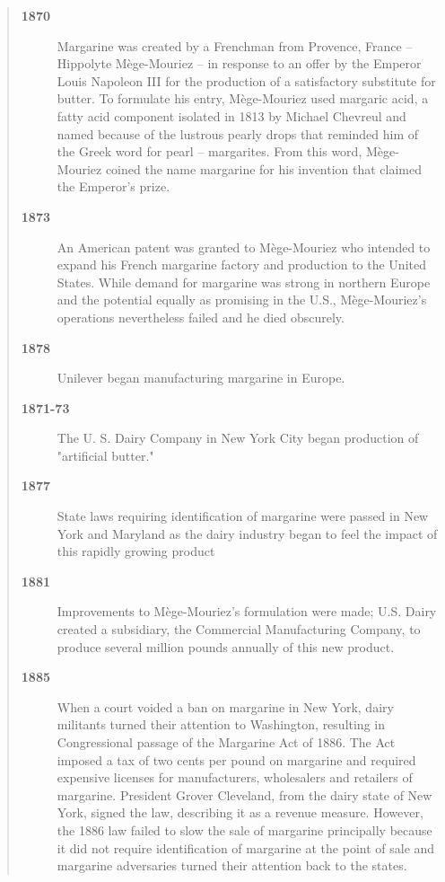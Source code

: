 \documentclass[mnsc,blindrev]{informs3} %
\begin{document}
\begin{quotation}

\begin{description}

\item[\bf 1870] Margarine was created by a Frenchman from Provence,
France -- Hippolyte M\`ege-Mouriez -- in response to an offer by
the Emperor Louis Napoleon III for the production of a satisfactory
substitute for butter. To formulate his entry, M\`ege-Mouriez used
margaric acid, a fatty acid component isolated in 1813 by Michael
Chevreul and named because of the lustrous pearly drops that reminded
him of the Greek word for pearl -- margarites. From this word,
M\`ege-Mouriez coined the name margarine for his invention that
claimed the Emperor's prize.

\item[\bf 1873] An American patent was granted to M\`ege-Mouriez who
intended to expand his French margarine factory and production to
the United States. While demand for margarine was strong in northern
Europe and the potential equally as promising in the U.S.,
M\`ege-Mouriez's operations nevertheless failed and he died obscurely.

\item[\bf 1878] Unilever began manufacturing margarine in Europe.

\item[\bf 1871-73] The U. S. Dairy Company in New York City began
production of "artificial butter."

\item[\bf 1877] State laws requiring identification of margarine were
passed in New York and Maryland as the dairy industry began to feel
the impact of this rapidly growing product

\item[\bf 1881] Improvements to M\`ege-Mouriez's formulation were made;
U.S. Dairy created a subsidiary, the Commercial Manufacturing Company,
to produce several million pounds annually of this new product.

\item[\bf 1885] When a court voided a ban on margarine in New York,
dairy militants turned their attention to Washington, resulting in
Congressional passage of the Margarine Act of 1886. The Act imposed
a tax of two cents per pound on margarine and required expensive
licenses for manufacturers, wholesalers and retailers of margarine.
President Grover Cleveland, from the dairy state of New York, signed
the law, describing it as a revenue measure. However, the 1886 law
failed to slow the sale of margarine principally because it did not
require identification of margarine at the point of sale and
margarine adversaries turned their attention back to the states.


\end{description}
\end{quotation}
\end{document}
